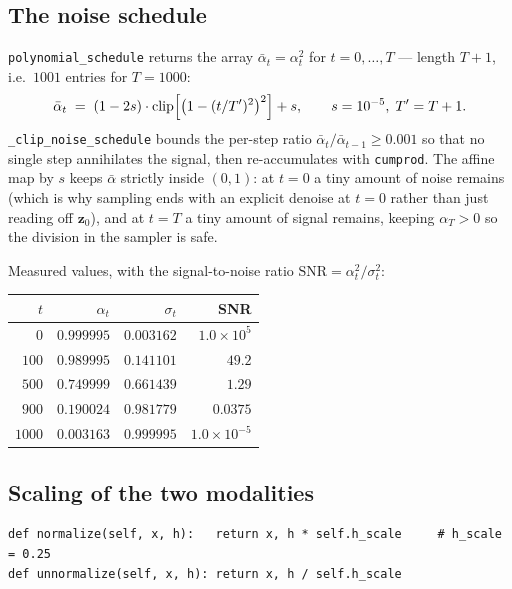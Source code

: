 \documentclass[11pt,a4paper]{article}
\newcommand{\code}[1]{\texttt{#1}}
\newcommand{\bz}{\mathbf{z}}
\begin{document}
\subsection{The noise schedule}

\code{polynomial\_schedule} returns the array $\bar\alpha_t=\alpha_t^2$ for
$t=0,\dots,T$ --- length $T+1$, i.e.\ $1001$ entries for $T=1000$:
\begin{equation}
  \bar\alpha_t \;=\; (1-2s)\cdot\text{clip}\Bigl[\bigl(1-(t/T')^{2}\bigr)^{2}\Bigr] + s,
  \qquad s=10^{-5},\; T'=T+1 .
\end{equation}
\code{\_clip\_noise\_schedule} bounds the per-step ratio
$\bar\alpha_t/\bar\alpha_{t-1}\ge 0.001$ so that no single step annihilates the
signal, then re-accumulates with \code{cumprod}. The affine map by $s$ keeps
$\bar\alpha$ strictly inside $(0,1)$: at $t=0$ a tiny amount of noise remains
(which is why sampling ends with an explicit denoise at $t=0$ rather than just
reading off $\bz_0$), and at $t=T$ a tiny amount of signal remains, keeping
$\alpha_T>0$ so the division in the sampler is safe.

Measured values, with the signal-to-noise ratio $\text{SNR}=\alpha_t^2/\sigma_t^2$:

\begin{center}
\begin{tabular}{@{}rrrr@{}}
\toprule
$t$ & $\alpha_t$ & $\sigma_t$ & SNR \\
\midrule
$0$    & $0.999995$ & $0.003162$ & $1.0\times10^{5}$ \\
$100$  & $0.989995$ & $0.141101$ & $49.2$ \\
$500$  & $0.749999$ & $0.661439$ & $1.29$ \\
$900$  & $0.190024$ & $0.981779$ & $0.0375$ \\
$1000$ & $0.003163$ & $0.999995$ & $1.0\times10^{-5}$ \\
\bottomrule
\end{tabular}
\end{center}

\subsection{Scaling of the two modalities}

\begin{lstlisting}
def normalize(self, x, h):   return x, h * self.h_scale     # h_scale = 0.25
def unnormalize(self, x, h): return x, h / self.h_scale
\end{lstlisting}
\end{document}
